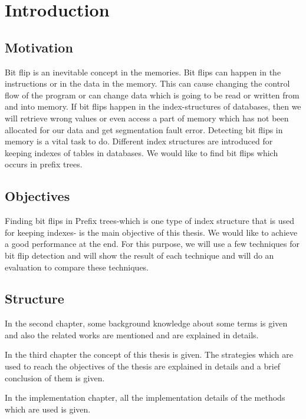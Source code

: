 \documentclass[12pt]{report}
\begin{document}

\tableofcontents

\chapter{Introduction}

\section{Motivation}

Bit flip is an inevitable concept in the memories. Bit flips can happen in the instructions or in the data in the memory. This can cause changing the control flow of the program or can change data which is going to be read or written from and into memory. If bit flips happen in the index-structures of databases, then we will retrieve wrong values or even access a part of memory which has not been allocated for our data and get segmentation fault error. Detecting bit flips in memory is a vital task to do. Different index structures are introduced for keeping indexes of tables in databases. We would like to find bit flips which occurs in prefix trees.  

\section{Objectives}

Finding bit flips in Prefix trees-which is one type of index structure that is used for keeping indexes- is the main objective of this thesis. We would like to achieve a good performance at the end. For this purpose, we will use a few techniques for bit flip detection and will show the result of each technique and will do an evaluation to compare these techniques.

\section{Structure}

In the second chapter, some background knowledge about some terms is given and also the related works are mentioned and are explained in details.

In the third chapter the concept of this thesis is given. The strategies which are used to reach the objectives of the thesis are explained in details and a brief conclusion of them is given. 

In the implementation chapter, all the implementation details of the methods which are used is given. 
\end{document}
